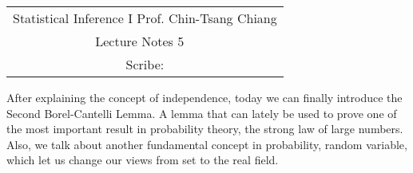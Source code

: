 \documentclass[../Probability_Theory.tex]{subfiles}
\begin{document}
	\begin{center}
		\renewcommand{\arraystretch}{2}
		\begin{bfseries}
			\begin{tabular}{|c|}
				\hline
				Statistical Inference I \hfill Prof. Chin-Tsang Chiang\\
				\hspace{15em} {\large Lecture Notes 5} \hspace{15em}\ \\
				\lecdate \hfill Scribe: \scribe\\
				\hline
			\end{tabular}
			\renewcommand{\arraystretch}{1}
		\end{bfseries}
	\end{center}

After explaining the concept of independence, today we can finally introduce the Second Borel-Cantelli Lemma. A lemma that can lately be used to prove one of the most important result in probability theory, the strong law of large numbers. Also, we talk about another fundamental concept in probability, random variable, which let us change our views from set to the real field.   
\end{document}
